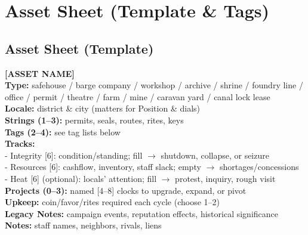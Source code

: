 \documentclass[11pt]{article}
\begin{document}
\tableofcontents
\newpage

\section{Asset Sheet (Template \& Tags)}
\subsection{Asset Sheet (Template)}
\begin{framed}
\noindent\textbf{[ASSET NAME]}\\
\textbf{Type:} safehouse / barge company / workshop / archive / shrine / foundry line / office / permit / theatre / farm / mine / caravan yard / canal lock lease\\
\textbf{Locale:} district \& city (matters for Position \& dials)\\
\textbf{Strings (1--3):} permits, seals, routes, rites, keys\\
\textbf{Tags (2--4):} see tag lists below\\
\textbf{Tracks:}\\
\hspace{10pt}- Integrity [6]: condition/standing; fill $\rightarrow$ shutdown, collapse, or seizure\\
\hspace{10pt}- Resources [6]: cashflow, inventory, staff slack; empty $\rightarrow$ shortages/concessions\\
\hspace{10pt}- Heat [6] (optional): locals' attention; fill $\rightarrow$ protest, inquiry, rough visit\\
\textbf{Projects (0--3):} named [4--8] clocks to upgrade, expand, or pivot\\
\textbf{Upkeep:} coin/favor/rites required each cycle (choose 1--2)\\
\textbf{Legacy Notes:} campaign events, reputation effects, historical significance\\
\textbf{Notes:} staff names, neighbors, rivals, liens
\end{framed}
\end{document}
